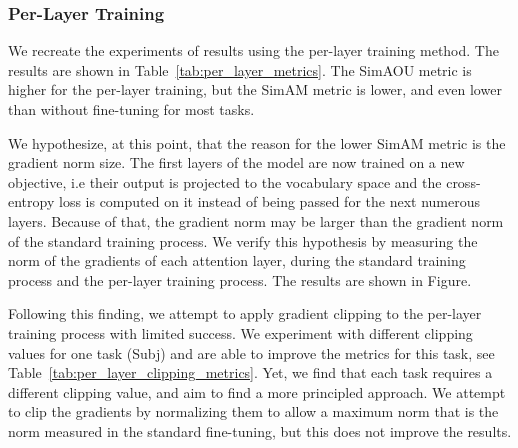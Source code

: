 \documentclass[11pt]{article}
\begin{document}
\subsubsection{Per-Layer Training}
We recreate the experiments of \cite{dai2023gpt} results using the per-layer training method.
The results are shown in Table~\ref{tab:per_layer_metrics}.
The SimAOU metric is higher for the per-layer training, but the SimAM metric is lower, and even lower than without fine-tuning for most tasks.

We hypothesize, at this point, that the reason for the lower SimAM metric is the gradient norm size.
The first layers of the model are now trained on a new objective, i.e their output is projected to the vocabulary space and the cross-entropy loss is computed on it instead of being passed for the next numerous layers.
Because of that, the gradient norm may be larger than the gradient norm of the standard training process.
We verify this hypothesis by measuring the norm of the gradients of each attention layer, during the standard training process and the per-layer training process.
The results are shown in Figure.

Following this finding, we attempt to apply gradient clipping to the per-layer training process with limited success.
We experiment with different clipping values for one task (Subj) and are able to improve the metrics for this task, see Table~\ref{tab:per_layer_clipping_metrics}.
Yet, we find that each task requires a different clipping value, and aim to find a more principled approach.
We attempt to clip the gradients by normalizing them to allow a maximum norm that is the norm measured in the standard fine-tuning, but this does not improve the results.
\end{document}
